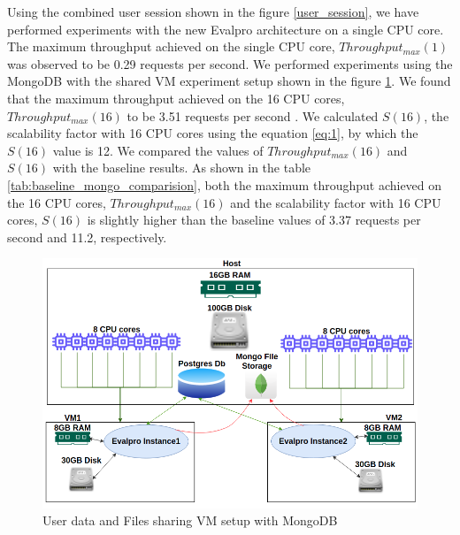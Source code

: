 \documentclass{iitbreport}
\begin{document}
Using the combined user session shown in the figure \ref{user_session}, we have performed experiments with the new Evalpro architecture on a single CPU core. The maximum throughput achieved on the single CPU core, $Throughput_{max}(1)$ was observed to be 0.29 requests per second. We performed experiments using the MongoDB with the shared VM experiment setup shown in the figure \ref{shared_vm_mongo}. We found that the maximum throughput achieved on the 16 CPU cores, $Throughput_{max}(16)$ to be 3.51 requests per second . We calculated $S(16)$, the scalability factor with 16 CPU cores using the equation \ref{eq:1}, by which the $S(16)$ value is 12. We compared the values of $Throughput_{max}(16)$ and $S(16)$ with the baseline results. As shown in the table \ref{tab:baseline_mongo_comparision}, both the maximum throughput achieved on the 16 CPU cores, $Throughput_{max}(16)$ and the scalability factor with 16 CPU cores, $S(16)$ is slightly higher than the baseline values of 3.37 requests per second and 11.2, respectively.


\begin{figure}[!htb]
  \centering
  \includegraphics[scale=0.45]{Images/shared_vm_mongo.png}
  \caption{User data and Files sharing VM setup with  MongoDB}
  \label{shared_vm_mongo}
\end{figure}
\end{document}
